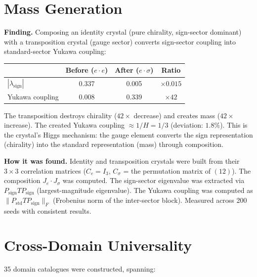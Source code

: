 \documentclass[11pt,a4paper]{article}
\theoremstyle{definition}
\theoremstyle{remark}
\begin{document}
\section{Mass Generation}\label{sec:massgen}

\textbf{Finding.} Composing an identity crystal (pure chirality, sign-sector dominant) with a transposition crystal (gauge sector) converts sign-sector coupling into standard-sector Yukawa coupling:

\begin{center}
\begin{tabular}{lccc}
\toprule
& Before ($e \cdot e$) & After ($e \cdot \sigma$) & Ratio \\
\midrule
$|\lambda_{\mathrm{sign}}|$ & 0.337 & 0.005 & $\times 0.015$ \\
Yukawa coupling & 0.008 & 0.339 & $\times 42$ \\
\bottomrule
\end{tabular}
\end{center}

The transposition destroys chirality ($42\times$ decrease) and creates mass ($42\times$ increase). The created Yukawa coupling $\approx 1/H = 1/3$ (deviation: $1.8\%$). This is the crystal's Higgs mechanism: the gauge element converts the sign representation (chirality) into the standard representation (mass) through composition.

\textbf{How it was found.} Identity and transposition crystals were built from their $3\times 3$ correlation matrices ($C_e = I_3$, $C_\sigma$ = the permutation matrix of $(12)$). The composition $J_e \cdot J_\sigma$ was computed. The sign-sector eigenvalue was extracted via $P_{\mathrm{sign}} T P_{\mathrm{sign}}$ (largest-magnitude eigenvalue). The Yukawa coupling was computed as $\|P_{\mathrm{std}} T P_{\mathrm{sign}}\|_F$ (Frobenius norm of the inter-sector block). Measured across 200 seeds with consistent results.


\section{Cross-Domain Universality}\label{sec:crossdomain}

35 domain catalogues were constructed, spanning:
\end{document}
